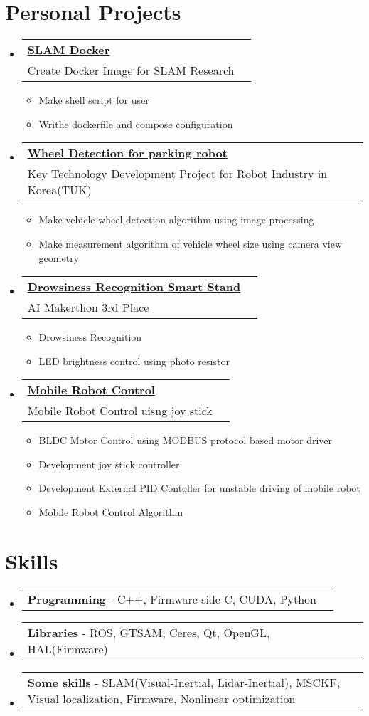 \documentclass[letterpaper,11pt]{article}
\makeatletter
\newcommand{\resumeItem}[1]{
  \item\small{
    {#1 \vspace{-2pt}}
  }
}
\newcommand{\resumeProject}[2]{
  \vspace{-1pt}\item
    \begin{tabular*}{0.97\textwidth}[t]{l@{\extracolsep{\fill}}r}
      \textbf{#1} \\
      \small{#2} \\
    \end{tabular*}\vspace{-5pt}
}
\newcommand{\resumeSkills}[1]{
  \item
    \begin{tabular*}{0.97\textwidth}[t]{l@{\extracolsep{\fill}}r}
      #1
    \end{tabular*}
}
\newcommand{\resumeSubHeadingListStart}{\begin{itemize}[leftmargin=*]}
\newcommand{\resumeSubHeadingListEnd}{\end{itemize}}
\newcommand{\resumeItemListStart}{\begin{itemize}}
\newcommand{\resumeItemListEnd}{\end{itemize}\vspace{-5pt}}
\makeatother
\begin{document}
\section{Personal Projects}
  \resumeSubHeadingListStart
    \resumeProject
        {\href{https://github.com/jaeseok4104/slam-docker}{SLAM Docker}}
        {Create Docker Image for SLAM Research}
          \resumeItemListStart
            \resumeItem{Make shell script for user}
            \resumeItem{Writhe dockerfile and compose configuration}
          \resumeItemListEnd
    \resumeProject
      {\href{https://github.com/jaeseok4104/ParkingRobot_Wheel_detection}{Wheel Detection for parking robot}}
      {Key Technology Development Project for Robot Industry in Korea(TUK)}
      \resumeItemListStart
        \resumeItem{Make vehicle wheel detection algorithm using image processing}
        \resumeItem{Make measurement algorithm of vehicle wheel size using camera view geometry}
      \resumeItemListEnd
    \resumeProject
      {\href{https://github.com/jaeseok4104/AI_IoT_makerthon}{Drowsiness Recognition Smart Stand}}
         {AI Makerthon 3rd Place}
         \resumeItemListStart
             \resumeItem{Drowsiness Recognition \\
             }
             \resumeItem{LED brightness control using photo resistor}
         \resumeItemListEnd
    
    \resumeProject
      {\href{https://github.com/jaeseok4104/M_robot}{Mobile Robot Control}}
      {Mobile Robot Control uisng joy stick}
      \resumeItemListStart
        \resumeItem{BLDC Motor Control using MODBUS protocol based motor driver}
        \resumeItem{Development joy stick controller}
        \resumeItem{Development External PID Contoller for unstable driving of mobile robot}
        \resumeItem{Mobile Robot Control Algorithm}
      \resumeItemListEnd
  \resumeSubHeadingListEnd



\section{Skills}
  \resumeSubHeadingListStart
    \resumeSkills{\textbf{Programming} - C++, Firmware side C, CUDA, Python}
    \resumeSkills{\textbf{Libraries} - ROS, GTSAM, Ceres, Qt, OpenGL, HAL(Firmware)}
    \resumeSkills{\textbf{Some skills} - SLAM(Visual-Inertial, Lidar-Inertial), MSCKF, Visual localization, Firmware, Nonlinear optimization}
  \resumeSubHeadingListEnd
\end{document}
